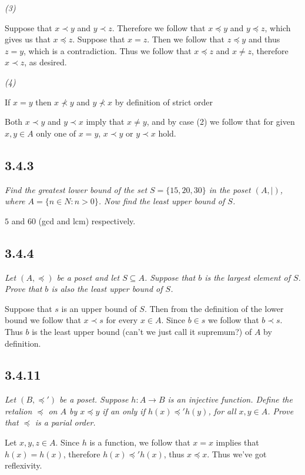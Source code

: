 \documentclass[11pt,oneside,titlepage]{book}
\begin{document}
\textit{(3)}

Suppose that $x \prec y$ and $y \prec z$. Therefore we follow that $x \preceq y$ and $y \preceq z$,
which gives us that $x \preceq z$. Suppose that $x = z$. Then we follow that $z \preceq y$
and thus $z = y$, which is a contradiction. Thus we follow that $x \preceq z$ and $x \neq z$,
therefore $x \prec z$, as desired.

\textit{(4)}

If $x = y$ then $x \not \prec y$ and $y \not \prec x$ by definition of strict order

Both $x \prec y$ and $y \prec x$ imply that $x \neq y$, and by case (2) we follow that
for given $x, y \in A$ only one of $x = y$, $x \prec y$ or $y \prec x$ hold.

\subsection*{3.4.3}

\textit{Find the greatest lower bound of the set $S = \{15, 20, 30\}$ in the poset
  $(A, |)$, where $A = \{n \in N: n > 0\}$. Now find the least upper bound of $S$.}

$5$ and $60$ (gcd and lcm) respectively.

\subsection*{3.4.4}

\textit{Let $(A, \preceq)$ be a poset and let $S \subseteq A$. Suppose that $b$ is the
  largest element of $S$. Prove that $b$ is also the least upper bound of $S$.}

Suppose that $s$ is an upper bound of $S$. Then from the definition of the lower bound we
follow that $x \prec s$ for every $x \in A$. Since $b \in s$ we follow that $b \prec s$.
Thus $b$ is the least upper bound (can't we just call it supremum?) of $A$ by definition.

\subsection*{3.4.11}

\textit{Let $(B, \preceq')$ be a poset. Suppose $h: A \to B$ is an injective function.
  Define the retalion $\preceq$ on $A$ by $x \preceq y$ if an only if $h(x) \preceq' h(y)$,
  for all $x, y \in A$. Prove that $\preceq$ is a parial order.}

Let $x, y, z \in A$. Since $h$ is a function, we follow that $x = x$ implies that $h(x) = h(x)$,
therefore $h(x) \preceq' h(x)$, thus $x \preceq x$. Thus we've got reflexivity.
\end{document}
